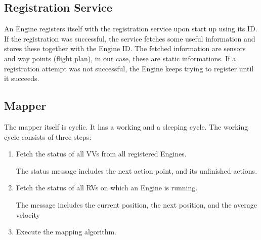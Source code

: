 \subsection{Registration Service}
An Engine registers itself with the registration service upon start up using its ID. If the registration was successful, the service
fetches some useful information and stores these together with the Engine ID. The fetched information are sensors and 
way points (flight plan), in our case, these are static informations. If a registration attempt was not successful, the Engine 
keeps trying to register until it succeeds.

\subsection{Mapper}
The mapper itself is cyclic. It has a working and a sleeping cycle.
The working cycle consists of three steps:


\begin{enumerate}
  \item Fetch the status of all \acp{VV} from all registered Engines.
  
  The status message includes the next action point, and its unfinished actions.
  
  \item Fetch the status of all \acp{RV} on which an Engine is running.
  
  The message includes the current position, the next position, and the average velocity
  
  \item Execute the mapping algorithm.
\end{enumerate}

